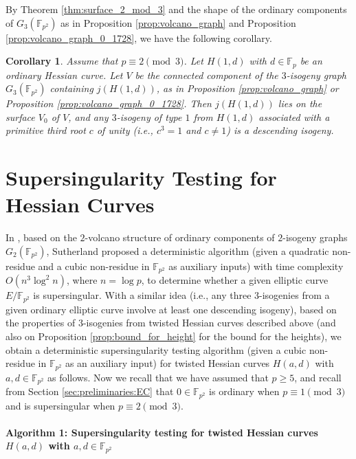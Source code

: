 \documentclass{article}
\newtheorem{corollary}[theorem]{Corollary}
\theoremstyle{definition}
\newcommand{\FF}{\mathbb{F}}
\begin{document}
By Theorem \ref{thm:surface_2_mod_3} and the shape of the ordinary components of $G_3(\FF_{p^2})$ as in Proposition \ref{prop:volcano_graph} and Proposition \ref{prop:volcano_graph_0_1728}, we have the following corollary.

\begin{corollary}
\label{cor:surface_2_mod_3}
Assume that $p \equiv 2 \pmod{3}$.
Let $H(1,d)$ with $d \in \FF_p$ be an ordinary Hessian curve.
Let $V$ be the connected component of the $3$-isogeny graph $G_3(\FF_{p^2})$ containing $j(H(1,d))$, as in Proposition \ref{prop:volcano_graph} or Proposition \ref{prop:volcano_graph_0_1728}.
Then $j(H(1,d))$ lies on the surface $V_0$ of $V$, and any $3$-isogeny of type $1$ from $H(1,d)$ associated with a primitive third root $c$ of unity (i.e., $c^3 = 1$ and $c \neq 1$) is a descending isogeny.
\end{corollary}


\section{Supersingularity Testing for Hessian Curves}
\label{sec:SStest}

In \cite{DBLP:journals/lmsjcm/Sutherland12a}, based on the $2$-volcano structure of ordinary components of $2$-isogeny graphs $G_2(\FF_{p^2})$, Sutherland proposed a deterministic algorithm (given a quadratic non-residue and a cubic non-residue in $\FF_{p^2}$ as auxiliary inputs) with time complexity $O(n^3 \log^2 n)$, where $n = \log p$, to determine whether a given elliptic curve $E/\FF_{p^2}$ is supersingular.
With a similar idea (i.e., any three $3$-isogenies from a given ordinary elliptic curve involve at least one descending isogeny), based on the properties of $3$-isogenies from twisted Hessian curves described above (and also on Proposition \ref{prop:bound_for_height} for the bound for the heights), we obtain a deterministic supersingularity testing algorithm (given a cubic non-residue in $\FF_{p^2}$ as an auxiliary input) for twisted Hessian curves $H(a,d)$ with $a,d \in \FF_{p^2}$ as follows.
Now we recall that we have assumed that $p \geq 5$, and recall from Section \ref{sec:preliminaries:EC} that $0 \in \FF_{p^2}$ is ordinary when $p \equiv 1 \pmod{3}$ and is supersingular when $p \equiv 2 \pmod{3}$.

\paragraph{Algorithm 1: Supersingularity testing for twisted Hessian curves $H(a,d)$ with $a,d \in \FF_{p^2}$}
\end{document}
